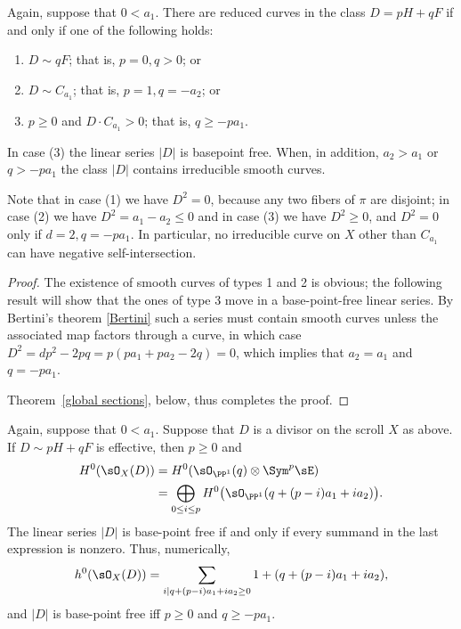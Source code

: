 \begin{theorem}\label{where are the curves?} Again, suppose that $0<a_{1}$.
There are reduced  curves in the class $D = pH+qF$ if and only if one of the following holds:

\begin{enumerate}
\item $D\sim qF$; that is, $p=0, q>0$; or
\item $D\sim C_{a_{1}}$; that is, $p=1, q=-a_{2}$; or
\item $p\geq 0$ and $D\cdot C_{a_{1}}> 0$; that is, $q \geq -pa_1.$
\end{enumerate}
In case (3) the linear series $|D|$ is basepoint free. When, in addition, $a_2>a_1$ or $q>-pa_1$ the class $|D|$ contains irreducible smooth curves.
\end{theorem}

Note that in case (1) we have $D^{2} = 0$, because any two fibers of $\pi$ are disjoint; in case (2) we have $D^{2}= a_{1}-a_{2}\leq 0$ and in case (3) we have $D^{2}\geq 0$, and $D^2=0$ only if
$d=2, q = -pa_1$. In particular, no irreducible curve
on $X$ other than $C_{a_1}$ can have negative self-intersection.

\begin{proof}
The existence of smooth curves of types 1 and 2 is obvious; the following result will show that
the ones of type 3 move in a base-point-free linear series. By Bertini's theorem \ref{Bertini} such a series must contain smooth curves unless the associated map factors through a curve, in which case $D^2 = dp^2-2pq = p(pa_1+pa_2 -2 q) = 0$, which implies that $a_2=a_1$ and $q= -pa_1$.

Theorem~\ref{global sections}, below, thus completes the proof.
\end{proof}

\begin{theorem}\label{global sections} Again, suppose that $0<a_{1}$.
Suppose that $D$ is a divisor on the scroll $X$ as above. If $D \sim pH+qF$ is effective,  then $p\geq 0$ and
\begin{align*}
 H^{0}(\sO_{X}(D)) &= H^{0}(\sO_{\PP^{1}}(q) \otimes \Sym^{p} \sE)\\
 &= 
\bigoplus_{0\leq i\leq p}H^{0}\bigl(\sO_{\PP^{1}}(q + (p-i)a_{1}+i a_{2})\bigr).
\end{align*}
The linear series $|D|$ is base-point free if and only if every summand in the last expression is nonzero.
Thus, numerically,
$$
h^{0}(\sO_{X}(D)) = 
\sum_{i \mid q+(p-i)a_{1}+i a_{2} \geq 0}1+(q + (p-i)a_{1}+i a_{2}),
$$
and
$|D|$ is base-point free iff $p\geq 0$ and $q\geq -pa_{1}$.
\end{theorem}


